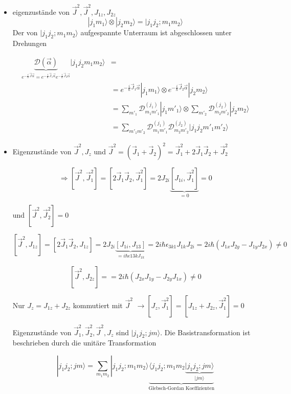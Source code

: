 \begin{itemize}
\item eigenzustände von \(\vec J^2,\vec J^2,J_{1z},J_{2z}\)
\[ |j_1m_1\rangle\otimes|j_2m_2\rangle = |j_1j_2;m_1m_2\rangle\]
Der von \(|j_1j_2;m_1m_2\rangle\) aufgespannte Unterraum ist abgeschlossen unter
Drehungen


\begin{align}\underbrace{ \mathcal D (\vec \alpha)}_{e^{-\frac i
      \hbar \vec J\vec\alpha}=e^{-\frac i \hbar \vec J_1\vec
      \alpha}e^{-\frac i \hbar    \vec J_2\vec
      \alpha}}|j_1j_2m_1m_2\rangle &= \\
&=e^{-\frac i \hbar \vec J_1\vec  \alpha}|j_1m_1\rangle\otimes e^{-\frac i \hbar \vec J_2\vec \alpha}|j_2m_2\rangle\\
&=\sum_{m'_1}\mathcal
D^{(j_1)}_{m_1m'_1}|j_1m'_1\rangle\otimes\sum_{m'_2}\mathcal
D^{(j_2)}_{m_2m'_2} |j_2m_2\rangle \\
&=\sum_{m'_1m'_2}\mathcal D^{(j_1)}_{m_1m'_1}\mathcal D^{(j_2)}_{m_2m'_2}|j_1j_2m'_1m'_2\rangle
\end{align}

\item Eigenzustände von \(\vec J^2,J_z\) und \(\vec J^2=(\vec J_1 + \vec J_2)^2=\vec J^2_1+2\vec J_1\vec J_2 + \vec J_2^2\)

\[\Rightarrow [\vec J^2,\vec J^2_1]=[2\vec J_1\vec J_2,\vec J_1^2]=2J_{2i}\underbrace{[J_{1i},\vec J_1^2]}_{=0}=0\]

und \([\vec J^2,\vec J^2_2]=0\)

\[ [\vec J^2,J_{1z}]=[2\vec J_1\vec
J_2,J_{1z}]=2J_{2i}\underbrace{[J_{1i},J_{13}]}_{=i\hbar\epsilon{13k}J_{1k}}= 2i\hbar\epsilon_{3k1}J_{1k}J_{2i}= 2i\hbar (J_{1x}J_{2y}-J_{1y}J_{2x}) \neq 0\]

\[ [\vec J^2,J_{2z}]== 2i\hbar (J_{2x}J_{1y}-J_{2y}J_{1x}) \neq 0 \]

Nur \(J_z=J_{1z}+J_{2z}\) kommutiert mit \(\vec J^2\) \(\rightarrow [J_z,\vec J^2_1]=[J_{1z}+J_{2z},\vec J^2_1]=0\)

Eigenzustände von \(\vec J^2_1, \vec J^2_2,\vec J^2, J_z\) sind
\(|j_1j_2;jm\rangle\). Die Basistransformation ist beschrieben durch die
unitäre Transformation

\[ |j_1j_2;jm\rangle = \sum_{m_1m_2}
|j_1j_2;m_1m_2\rangle\underbrace{\langle
  j_1j_2;m_1m_2\underbrace{|j_1j_2;jm\rangle}_{|jm\rangle}}_{\text{Glebsch-Gordan Koeffizienten}}\]

\end{itemize}

